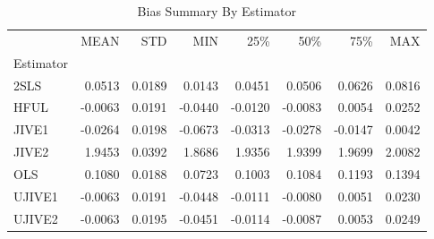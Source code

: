 \begin{table}[ht]
\centering
\caption{Bias Summary By Estimator}
\begin{tabular}{lrrrrrrr}
\toprule
 & MEAN & STD & MIN & 25\% & 50\% & 75\% & MAX \\
Estimator &  &  &  &  &  &  &  \\
\midrule
2SLS & 0.0513 & 0.0189 & 0.0143 & 0.0451 & 0.0506 & 0.0626 & 0.0816 \\
HFUL & -0.0063 & 0.0191 & -0.0440 & -0.0120 & -0.0083 & 0.0054 & 0.0252 \\
JIVE1 & -0.0264 & 0.0198 & -0.0673 & -0.0313 & -0.0278 & -0.0147 & 0.0042 \\
JIVE2 & 1.9453 & 0.0392 & 1.8686 & 1.9356 & 1.9399 & 1.9699 & 2.0082 \\
OLS & 0.1080 & 0.0188 & 0.0723 & 0.1003 & 0.1084 & 0.1193 & 0.1394 \\
UJIVE1 & -0.0063 & 0.0191 & -0.0448 & -0.0111 & -0.0080 & 0.0051 & 0.0230 \\
UJIVE2 & -0.0063 & 0.0195 & -0.0451 & -0.0114 & -0.0087 & 0.0053 & 0.0249 \\
\bottomrule
\end{tabular}
\end{table}
